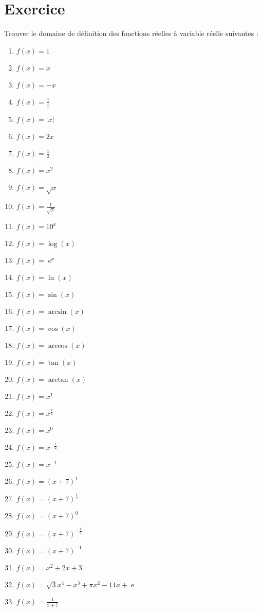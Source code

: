 \documentclass[a4paper,12pt]{article}
\DeclareMathOperator{\e}{e}
\begin{document}
\section{Exercice}\label{exercice}
Trouver le domaine de d\'efinition des fonctions r\'eelles \`a variable r\'eelle suivantes : 
\begin{multicols}{2}
\begin{enumerate}

\item $f(x)=1$
\item $f(x)=x$
\item $f(x)=-x$
\item $f(x)=\frac{1}{x}$
\item $f(x)=|x|$
\item $f(x)=2x$
\item $f(x)= \frac{x}{2}$
\item $f(x)=x^2$
\item $f(x)=\sqrt{x}$
\item $f(x)=\frac{1}{\sqrt{x}}$
\item $f(x)=10^x$
\item $f(x)=\log(x)$
\item $f(x)=\e^x$
\item $f(x)=\ln(x)$
\item $f(x)=\sin(x)$
\item $f(x)=\arcsin(x)$
\item $f(x)=\cos(x)$
\item $f(x)=\arccos(x)$
\item $f(x)=\tan(x)$
\item $f(x)=\arctan(x)$
\item $f(x)=x^1$
\item $f(x)=x^{\frac{1}{2}}$
\item $f(x)=x^0$
\item $f(x)=x^{-\frac{1}{2}}$
\item $f(x)=x^{-1}$
\item $f(x)=(x+7)^1$
\item $f(x)=(x+7)^{\frac{1}{2}}$
\item $f(x)=(x+7)^0$
\item $f(x)=(x+7)^{-\frac{1}{2}}$
\item $f(x)=(x+7)^{-1}$
\item $f(x)=x^2+2x+3$
\item $f(x)=\sqrt{3}x^4-x^3+\pi x^2-11x+\e$
\item $f(x)=\frac{1}{x+7}$

\end{enumerate}
\end{multicols}
\end{document}
